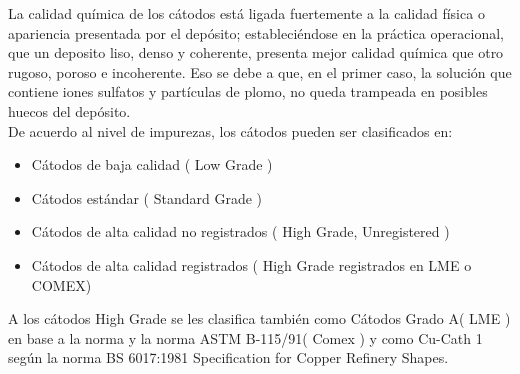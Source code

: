 La calidad qu\'imica de los c\'atodos est\'a ligada fuertemente a la calidad f\'isica o apariencia presentada por el dep\'osito; estableci\'endose en la pr\'actica operacional, que un deposito liso, denso y coherente, presenta mejor calidad qu\'imica que otro rugoso, poroso e incoherente. Eso se debe a que, en el primer caso, la soluci\'on que contiene iones sulfatos y part\'iculas de plomo, no queda trampeada en posibles huecos del dep\'osito. \\

De acuerdo al nivel de impurezas, los c\'atodos pueden ser clasificados en:
\begin{itemize}
 \item C\'atodos de baja calidad ( Low Grade )
 \item C\'atodos est\'andar ( Standard Grade )
 \item C\'atodos de alta calidad no registrados ( High Grade, Unregistered )
 \item C\'atodos de alta calidad registrados ( High Grade registrados en LME o COMEX)
\end{itemize}

A los c\'atodos High Grade se les clasifica tambi\'en como \textacutedbl C\'atodos Grado A\textgravedbl ( LME ) en base a la norma y la norma ASTM B-115/91( Comex ) y como Cu-Cath 1 seg\'un la norma BS 6017:1981 \textacutedbl Specification for Copper Refinery Shapes.\textgravedbl


